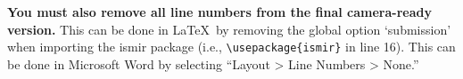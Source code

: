 \documentclass{article}
\begin{document}
\textbf{You must also remove all line numbers from the final camera-ready version.} This can be done in \LaTeX\ by removing the global option `submission' when importing the ismir package (i.e., \texttt{\textbackslash usepackage\{ismir\}} in line 16). This can be done in Microsoft Word by selecting ``Layout > Line Numbers > None.''



%
%
%
%
\end{document}
